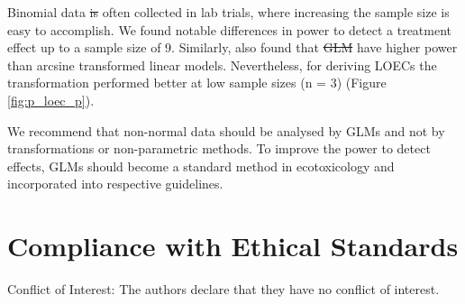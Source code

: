 \documentclass[twocolumn, natbib]{svjour3}
\providecommand{\DIFadd}[1]{{\protect\color{blue}\uwave{#1}}} %
\providecommand{\DIFdel}[1]{{\protect\color{red}\sout{#1}}}                      %
\providecommand{\DIFaddbegin}{} %
\providecommand{\DIFaddend}{} %
\providecommand{\DIFdelbegin}{} %
\providecommand{\DIFdelend}{} %
\begin{document}
Binomial data \DIFdelbegin \DIFdel{is }\DIFdelend \DIFaddbegin \DIFadd{are }\DIFaddend often collected in lab trials, where increasing the sample size is easy to accomplish. 
We found notable differences in power to detect a treatment effect up to a sample size of 9.
Similarly, \citet{warton_arcsine_2011} also found that \DIFdelbegin \DIFdel{GLM }\DIFdelend \DIFaddbegin \DIFadd{GLMs }\DIFaddend have higher power than arcsine transformed linear models.
Nevertheless, for deriving LOECs the transformation performed better at low sample sizes (n = 3) (Figure \ref{fig:p_loec_p}). 

We recommend that non-normal data should be analysed by GLMs and not by transformations or non-parametric methods.
To improve the power to detect effects, GLMs should become a standard method in ecotoxicology and incorporated into respective guidelines.


\section{Compliance with Ethical Standards}
Conflict of Interest: The authors declare that they have no conflict of interest.



\end{document}

